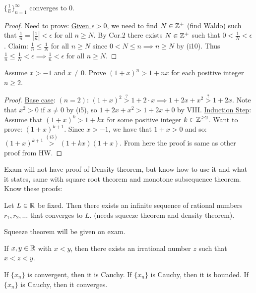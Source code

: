 \documentclass[]{article}
\begin{document}
\begin{example}
	$\{\frac{1}{n}\}_{n=1}^\infty$ converges to 0.
\end{example}
\begin{proof}
	Need to prove: \ul{Given $\epsilon>0$}, we need to find \ul{$N\in\mathbb{Z}^+$} (find Waldo) such that $\frac{1}{n}=|\frac{1}{n}|<\epsilon$ for all $n\geq N$. By Cor.2 there exists $N\in\mathbb{Z}^+$ such that $0<\frac{1}{N}<\epsilon$. Claim: $\frac{1}{n} \leq \frac{1}{N}$ for all $n\geq N$ since $0<N\leq n \implies n\geq N$ by (i10). Thus $\frac{1}{n}\leq \frac{1}{N} < \epsilon \implies \frac{1}{n}<\epsilon$ for all $n\geq N$.
\end{proof} 

\begin{example}
	 Assume $x>-1$ and \ul{$x\neq 0$}. Prove $(1+x)^n > 1+nx$ for each positive integer \ul{$n\geq 2$}.
\end{example}
\begin{proof}
	\ul{Base case}: $(n=2)$: $(1+x)^2 \stackrel{?}{>} 1 + 2\cdot x \implies 1+2x + x^2 \stackrel{?}{>} 1+2x $. Note that $x^2>0$ if $x\neq 0$ by (i5), so $1+2x+x^2 > 1 + 2x + 0$ by VIII.
	\ul{Induction Step}: Assume that $(1+x)^k>1+kx$ for some positive integer $k\in\mathbb{Z}^{\geq 2}$. Want to prove: $(1+x)^{k+1}$. Since $x>-1$, we have that $1+x>0$ and so: $(1+x)^{k+1} \stackrel{(i3)}{>} (1+kx)(1+x)$. From here the proof is same as other proof from HW.
\end{proof}

Exam will not have proof of Density theorem, but know how to use it and what it states, same with square root theorem and monotone subsequence theorem.
Know these proofs:

\begin{recall}
	 Let $L\in\mathbb{R}$ be fixed. Then there exists an infinite sequence of rational numbers $r_1,r_2,\dots$ that converges to $L$. (needs squeeze theorem and density theorem).
\end{recall}

Squeeze theorem will be given on exam.

\begin{recall}
	 If $x,y\in\mathbb{R}$ with $x<y$, then there exists an irrational number $z$ such that $x<z<y$.
\end{recall}
\begin{recall}
	[\ul{3 proofs}] 
	If $\{x_n\}$ is convergent, then it is Cauchy.
	If $\{x_n\}$ is Cauchy, then it is bounded.
	If $\{x_n\}$ is Cauchy, then it converges.
\end{recall}
\end{document}
